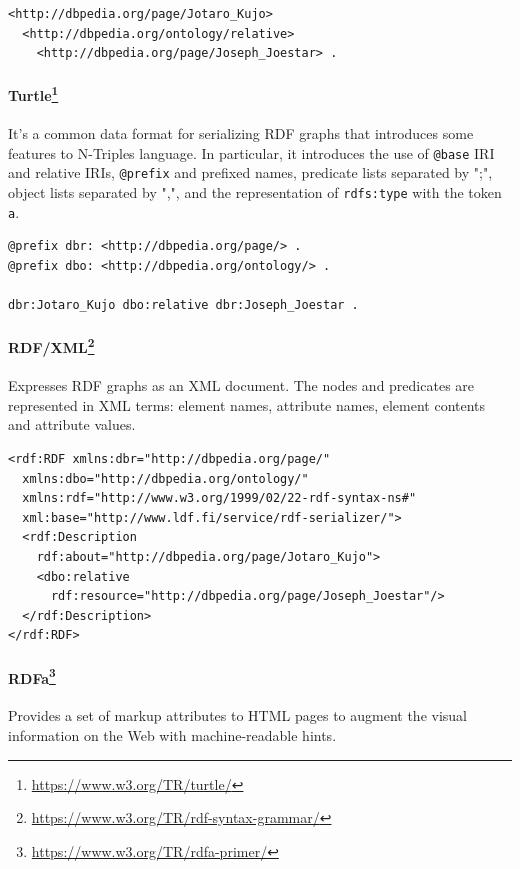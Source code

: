 \begin{verbatim}
<http://dbpedia.org/page/Jotaro_Kujo>
  <http://dbpedia.org/ontology/relative>
    <http://dbpedia.org/page/Joseph_Joestar> .
\end{verbatim}

\paragraph*{Turtle\footnote{\url{https://www.w3.org/TR/turtle/}}} It's a common data format for serializing \ac{RDF} graphs that introduces some features to N-Triples language. In particular, it introduces the use of \texttt{@base} \ac{IRI} and relative \acp{IRI}, \texttt{@prefix} and prefixed names, predicate lists separated by ";", object lists separated by ",", and the representation of \texttt{rdfs:type} with the token \texttt{a}.

\begin{verbatim}
@prefix dbr: <http://dbpedia.org/page/> .
@prefix dbo: <http://dbpedia.org/ontology/> .

dbr:Jotaro_Kujo dbo:relative dbr:Joseph_Joestar .
\end{verbatim}

\paragraph*{RDF/XML\footnote{\url{https://www.w3.org/TR/rdf-syntax-grammar/}}} Expresses \ac{RDF} graphs as an \acs{XML} document. The nodes and predicates are represented in \acs{XML} terms: element names, attribute names, element contents and attribute values.

\begin{verbatim}
<rdf:RDF xmlns:dbr="http://dbpedia.org/page/"
  xmlns:dbo="http://dbpedia.org/ontology/"
  xmlns:rdf="http://www.w3.org/1999/02/22-rdf-syntax-ns#"
  xml:base="http://www.ldf.fi/service/rdf-serializer/">
  <rdf:Description
    rdf:about="http://dbpedia.org/page/Jotaro_Kujo">
    <dbo:relative
      rdf:resource="http://dbpedia.org/page/Joseph_Joestar"/>
  </rdf:Description>
</rdf:RDF>    
\end{verbatim}

\paragraph*{\ac{RDFa}\footnote{\url{https://www.w3.org/TR/rdfa-primer/}}} Provides a set of markup attributes to \acs{HTML} pages to augment the visual information on the Web with machine-readable hints.

